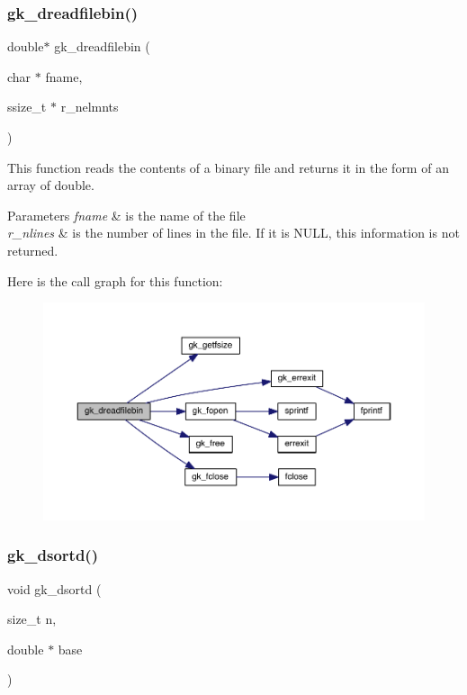 \subsubsection{\texorpdfstring{gk\+\_\+dreadfilebin()}{gk\_dreadfilebin()}}
{\footnotesize\ttfamily double$\ast$ gk\+\_\+dreadfilebin (\begin{DoxyParamCaption}\item[{char $\ast$}]{fname,  }\item[{ssize\+\_\+t $\ast$}]{r\+\_\+nelmnts }\end{DoxyParamCaption})}

This function reads the contents of a binary file and returns it in the form of an array of double. 
\begin{DoxyParams}{Parameters}
{\em fname} & is the name of the file \\
\hline
{\em r\+\_\+nlines} & is the number of lines in the file. If it is N\+U\+LL, this information is not returned. \\
\hline
\end{DoxyParams}
Here is the call graph for this function\+:\nopagebreak
\begin{figure}[H]
\begin{center}
\leavevmode
\includegraphics[width=350pt]{a00077_a2a9dbcb6a3f167b0fd20e431612e5aa9_cgraph}
\end{center}
\end{figure}
\mbox{\label{a00077_a6e1f615368dfbfb4b0f391ef65160454}} 
\subsubsection{\texorpdfstring{gk\+\_\+dsortd()}{gk\_dsortd()}}
{\footnotesize\ttfamily void gk\+\_\+dsortd (\begin{DoxyParamCaption}\item[{size\+\_\+t}]{n,  }\item[{double $\ast$}]{base }\end{DoxyParamCaption})}

